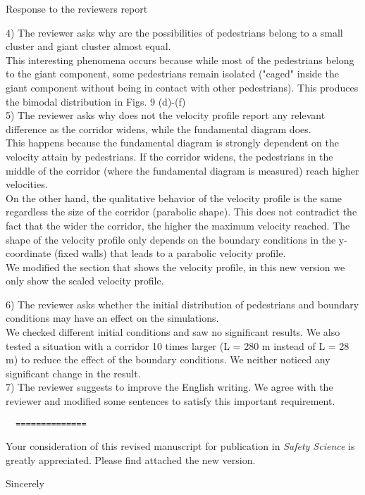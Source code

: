 \documentclass[a4paper,12pt]{letter}
\begin{document}
\begin{letter}{Response to the reviewers report}
{4) The reviewer asks why are the possibilities of pedestrians belong to a small cluster and giant cluster almost equal. \\

This interesting phenomena occurs because while most of the pedestrians belong to the giant component, some pedestrians remain isolated ("caged" inside the giant component without being in contact with other pedestrians). This produces the bimodal distribution in Figs. 9 (d)-(f)\\

5) The reviewer asks why does not the velocity profile report any relevant difference as the corridor widens, while the fundamental diagram does.\\

This happens because the fundamental diagram is strongly dependent on the velocity attain by pedestrians. If the corridor widens, the pedestrians in the middle of the corridor (where the fundamental diagram is measured) reach higher velocities. \\

On the other hand, the qualitative behavior of the velocity profile is the same regardless the size of the corridor (parabolic shape). This does not contradict the fact that the wider the corridor, the higher the maximum velocity reached. The shape of the velocity profile only depends on the boundary conditions in the y-coordinate (fixed walls) that leads to a parabolic velocity profile. \\

We modified the section that shows the velocity profile, in this new version we only show the scaled velocity profile. 

6) The reviewer asks whether the initial distribution of pedestrians and boundary conditions may have an effect on the simulations.\\

We checked different initial conditions and saw no significant results. We also tested a situation with a corridor 10 times larger (L = 280 m instead of L = 28 m) to reduce the effect of the boundary conditions. We neither noticed any significant change in the result. \\

7) The reviewer suggests to improve the English writing. We agree with the reviewer and modified some sentences to satisfy this important requirement.  \\

\begin{verbatim}
  ==============
\end{verbatim}

}

Your consideration of this revised manuscript for publication in 
\textit{Safety Science} is greatly appreciated. 
Please find attached the new version. \\


\closing{Sincerely}


\end{letter}
\end{document}
